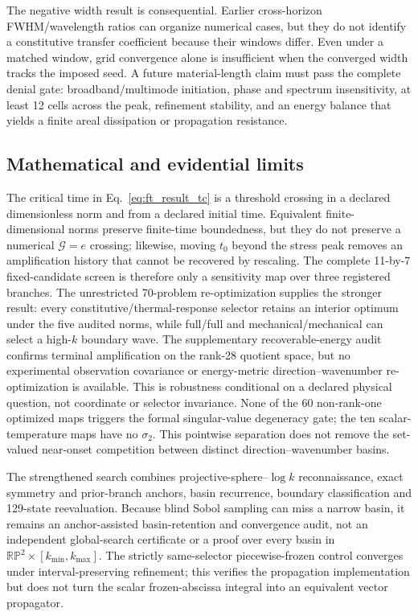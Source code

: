 The negative width result is consequential. Earlier cross-horizon FWHM/wavelength ratios can organize numerical cases, but they do not identify a constitutive transfer coefficient because their windows differ. Even under a matched window, grid convergence alone is insufficient when the converged width tracks the imposed seed. A future material-length claim must pass the complete denial gate: broadband/multimode initiation, phase and spectrum insensitivity, at least 12 cells across the peak, refinement stability, and an energy balance that yields a finite areal dissipation or propagation resistance.

\subsection{Mathematical and evidential limits}

The critical time in Eq.~\eqref{eq:ft_result_tc} is a threshold crossing in a declared dimensionless norm and from a declared initial time. Equivalent finite-dimensional norms preserve finite-time boundedness, but they do not preserve a numerical $\mathcal G=e$ crossing; likewise, moving $t_0$ beyond the stress peak removes an amplification history that cannot be recovered by rescaling. The complete 11-by-7 fixed-candidate screen is therefore only a sensitivity map over three registered branches. The unrestricted 70-problem re-optimization supplies the stronger result: every constitutive/thermal-response selector retains an interior optimum under the five audited norms, while full/full and mechanical/mechanical can select a high-$k$ boundary wave. The supplementary recoverable-energy audit confirms terminal amplification on the rank-28 quotient space, but no experimental observation covariance or energy-metric direction--wavenumber re-optimization is available. This is robustness conditional on a declared physical question, not coordinate or selector invariance. None of the 60 non-rank-one optimized maps triggers the formal singular-value degeneracy gate; the ten scalar-temperature maps have no $\sigma_2$. This pointwise separation does not remove the set-valued near-onset competition between distinct direction--wavenumber basins.

The strengthened search combines projective-sphere--$\log k$ reconnaissance, exact symmetry and prior-branch anchors, basin recurrence, boundary classification and 129-state reevaluation. Because blind Sobol sampling can miss a narrow basin, it remains an anchor-assisted basin-retention and convergence audit, not an independent global-search certificate or a proof over every basin in $\mathbb{RP}^2\times[k_{\min},k_{\max}]$. The strictly same-selector piecewise-frozen control converges under interval-preserving refinement; this verifies the propagation implementation but does not turn the scalar frozen-abscissa integral into an equivalent vector propagator.

